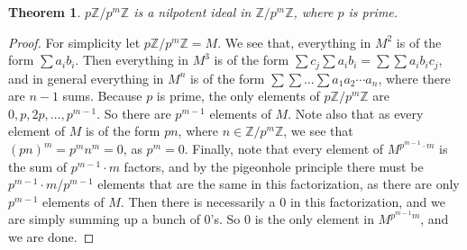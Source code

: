 \documentclass[12pt]{article}
\def\mbb#1{\mathbb{#1}}
\def\Z{\mbb{Z}}
\newtheorem{theorem}{Theorem}[section]
\theoremstyle{definition}
\theoremstyle{remark}
\begin{document}
	\begin{theorem}
		 $p\Z/p^m\Z$ is a nilpotent ideal in $\Z/p^m\Z$, where $p$ is prime. 
	\end{theorem}
	\begin{proof}
	For simplicity let $p\Z/p^m\Z = M$. We see that, everything in $M^2$ is of the form $\sum a_ib_i$. Then everything in $M^3$ is of the form $\sum c_j \sum a_ib_i = \sum \sum a_ib_ic_j$, and in general everything in $M^n$ is of the form $\sum \sum \hdots \sum a_1a_2\cdots a_n$, where there are $n-1$ sums. Because $p$ is prime, the only elements of $p\Z/p^m\Z$ are $0, p, 2p, \ldots, p^{m-1}$. So there are $p^{m-1}$ elements of $M$. Note also that as every element of $M$ is of the form $pn$, where $n \in \Z/p^m\Z$, we see that $(pn)^m = p^mn^m = 0$, as $p^m = 0$. Finally, note that every element of $M^{p^{m-1} \cdot m}$ is the sum of $p^{m-1} \cdot m$ factors, and by the pigeonhole principle there must be $p^{m-1} \cdot m / p^{m-1}$ elements that are the same in this factorization, as there are only $p^{m-1}$ elements of $M$. Then there is necessarily a 0 in this factorization, and we are simply summing up a bunch of 0's. So 0 is the only element in $M^{p^{m-1}m}$, and we are done.
	\end{proof}
\end{document}
